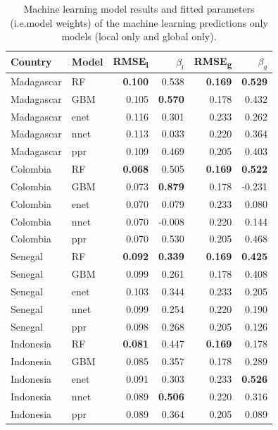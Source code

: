 \documentclass[11pt]{article}
\begin{document}
\begin{table}
\caption{Machine learning model results and fitted parameters (i.e.\thinspace model weights) of the machine learning predictions only models (local only and global only). }
\centering
\small
\begin{tabular}{ll|rr|rr}
     Country          & Model &      RMSE\textsubscript{l} & $\beta_l$ & RMSE\textsubscript{g} & $\beta_g$ \\ \hline
Madagascar & RF & \textbf{0.100} & 0.538 &  \textbf{0.169} & \textbf{0.529}\\
Madagascar & GBM & 0.105 & \textbf{0.570} & 0.178& 0.432 \\
Madagascar & enet & 0.116 & 0.301 &0.233 & 0.262 \\
Madagascar & nnet & 0.113 & 0.033 &0.220 & 0.364 \\
Madagascar & ppr & 0.109 & 0.469 & 0.205 &  0.403\vspace{0.3cm}\\ 
Colombia & RF & \textbf{0.068} & 0.505 &  \textbf{0.169} & \textbf{0.522}\\
Colombia & GBM & 0.073 & \textbf{0.879} & 0.178& -0.231  \\
Colombia & enet & 0.070 & 0.079 &0.233 & 0.080 \\
Colombia & nnet & 0.070 & -0.008 &0.220 & 0.144 \\
Colombia & ppr & 0.070 & 0.530 & 0.205 &  0.468\vspace{0.3cm}\\
Senegal & RF & \textbf{0.092} & \textbf{0.339} & \textbf{0.169} & \textbf{0.425} \\
Senegal & GBM & 0.099 & 0.261& 0.178& 0.408 \\
Senegal & enet& 0.103 & 0.344  &0.233 & 0.205 \\
Senegal & nnet & 0.099 & 0.254 &0.220 & 0.190 \\
Senegal & ppr & 0.098 & 0.268& 0.205 &  0.126\vspace{0.3cm}\\
Indonesia & RF& \textbf{0.081} & 0.447 & \textbf{0.169} & 0.178\\
Indonesia & GBM & 0.085 & 0.357 & 0.178& 0.289 \\
Indonesia & enet & 0.091 & 0.303 &0.233 & \textbf{0.526} \\
Indonesia & nnet & 0.089 & \textbf{0.506} &0.220 & 0.316 \\
Indonesia & ppr & 0.089 & 0.364 & 0.205 &  0.089\vspace{0.3cm}\\

\end{tabular}
\label{t:mlresults}
\end{table}
\end{document}
